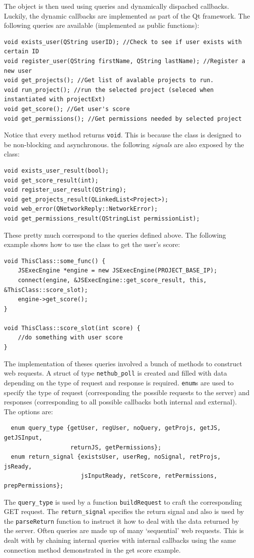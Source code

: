 \documentclass{article}
\begin{document}
The object is then used using queries and dynamically dispached callbacks. Luckily, the dynamic callbacks are implemented as part
of the Qt framework. The following queries are available (implemented as public functions):
\begin{verbatim}
void exists_user(QString userID); //Check to see if user exists with certain ID
void register_user(QString firstName, QString lastName); //Register a new user
void get_projects(); //Get list of avalable projects to run.
void run_project(); //run the selected project (seleced when instantiated with projectExt)
void get_score(); //Get user's score
void get_permissions(); //Get permissions needed by selected project
\end{verbatim}
Notice that every method returns \texttt{void}. This is because the class is designed to be non-blocking and asynchronous.
the following \textit{signals} are also exposed by the class:
\begin{verbatim}
void exists_user_result(bool);
void get_score_result(int);
void register_user_result(QString);
void get_projects_result(QLinkedList<Project>);
void web_error(QNetworkReply::NetworkError);
void get_permissions_result(QStringList permissionList);
\end{verbatim}
These pretty much correspond to the queries defined above. The following example shows how to use the class to get the user's score:
\begin{verbatim}
void ThisClass::some_func() {
    JSExecEngine *engine = new JSExecEngine(PROJECT_BASE_IP);
    connect(engine, &JSExecEngine::get_score_result, this, &ThisClass::score_slot);
    engine->get_score();
}

void ThisClass::score_slot(int score) {
    //do something with user score
}
\end{verbatim}

The implementation of theses queries involved a bunch of methods to construct web requests. A struct of type \texttt{nethub\_poll}
is created and filled with data depending on the type of request and response is required. \texttt{enum}s are used to specify
the type of request (corresponding the possible requests to the server) and responses (corresponding to all possible callbacks
both internal and external). The options are:
\begin{verbatim}
  enum query_type {getUser, regUser, noQuery, getProjs, getJS, getJSInput, 
                   returnJS, getPermissions};
  enum return_signal {existsUser, userReg, noSignal, retProjs, jsReady,
                      jsInputReady, retScore, retPermissions, prepPermissions};
\end{verbatim}
The \texttt{query\_type} is used by a function \texttt{buildRequest} to craft the corresponding GET request. The
\texttt{return\_signal} specifies the return signal and also is used by the \texttt{parseReturn} function to instruct it
how to deal with the data returned by the server. Often queries are made up of many `sequential' web requests. This is dealt with
by chaining internal queries with internal callbacks using the same connection method demonstrated in the get score example.
\end{document}
